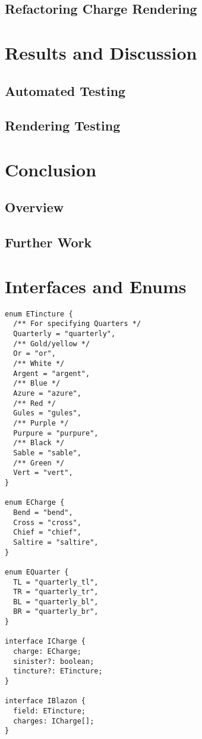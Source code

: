 \documentclass[nobib, a4paper, twoside, justified]{tufte-book}
\begin{document}
\section{Refactoring Charge Rendering}%
\label{sec:refactoring_charge_rendering}

\chapter{Results and Discussion}%
\label{cha:results_and_discussion}

\section{Automated Testing}%
\label{sec:automated_testing}

\section{Rendering Testing}%
\label{sec:rendering_testing}

\chapter{Conclusion}%
\label{cha:conclusion}

\section{Overview}%
\label{sec:overview}

\section{Further Work}%
\label{sec:further_work}



\backmatter

\printbibliography[heading=bibintoc]

\printglossary

\appendix
{}

\chapter{Interfaces and Enums}%
\label{cha:interfaces_and_enums}

\begin{verbatim}
enum ETincture {
  /** For specifying Quarters */
  Quarterly = "quarterly",
  /** Gold/yellow */
  Or = "or",
  /** White */
  Argent = "argent",
  /** Blue */
  Azure = "azure",
  /** Red */
  Gules = "gules",
  /** Purple */
  Purpure = "purpure",
  /** Black */
  Sable = "sable",
  /** Green */
  Vert = "vert",
}

enum ECharge {
  Bend = "bend",
  Cross = "cross",
  Chief = "chief",
  Saltire = "saltire",
}

enum EQuarter {
  TL = "quarterly_tl",
  TR = "quarterly_tr",
  BL = "quarterly_bl",
  BR = "quarterly_br",
}

interface ICharge {
  charge: ECharge;
  sinister?: boolean;
  tincture?: ETincture;
}

interface IBlazon {
  field: ETincture;
  charges: ICharge[];
}
\end{verbatim}

\end{document}
